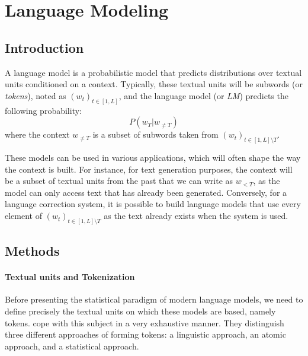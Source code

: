 \section{Language Modeling}
\label{sec:rw_lm}


\subsection{Introduction}
A language model is a probabilistic model that predicts distributions over textual units conditioned on a context. Typically, these textual units will be subwords (or \textit{tokens}), noted as $(w_t)_{t\in[1, L]}$, and the language model (or \textit{LM}) predicts the following probability:
$$
P(w_T | w_{\neq T})
$$
where the context $w_{\neq T}$ is a subset of subwords taken from $(w_t)_{t\in[1, L] \setminus T}$.

These models can be used in various applications, which will often shape the way the context is built. For instance, for text generation purposes, the context will be a subset of textual units from the past that we can write as $w_{< T}$, as the model can only access text that has already been generated. Conversely, for a language correction system, it is possible to build language models that use every element of $(w_t)_{t\in[1, L] \setminus T}$ as the text already exists when the system is used.


\subsection{Methods}

\paragraph*{Textual units and Tokenization}
\label{subsec:rw_lm_tokenization}

Before presenting the statistical paradigm of modern language models, we need to define precisely the textual units on which these models are based, namely tokens. \citet{mielke2021wordscharactersbriefhistory} cope with this subject in a very exhaustive manner. They distinguish three different approaches of forming tokens: a linguistic approach, an atomic approach, and a statistical approach.


